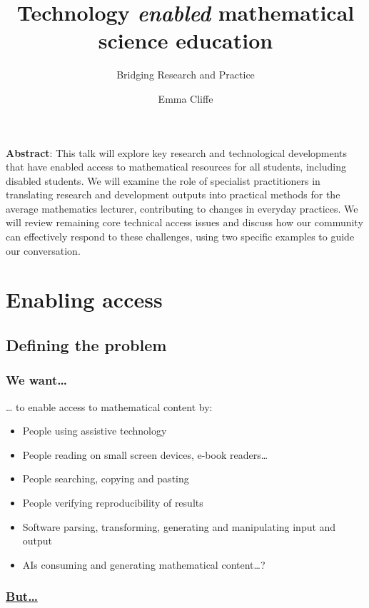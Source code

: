 \documentclass[
  letterpaper,
  DIV=11,
  numbers=noendperiod]{scrartcl}
\title{Technology \emph{enabled} mathematical science education}
\subtitle{Bridging Research and Practice}
\author{Emma Cliffe}
\date{}
\providecommand{\tightlist}{%
  \setlength{\itemsep}{0pt}\setlength{\parskip}{0pt}}\usepackage{longtable,booktabs,array}
\renewcommand*\contentsname{Table of contents}
\newcommand\contentsname{Table of contents}
\begin{document}
\maketitle

\renewcommand*\contentsname{Table of contents}
{
\hypersetup{linkcolor=}
\setcounter{tocdepth}{3}
\tableofcontents
}
\textbf{Abstract}: This talk will explore key research and technological
developments that have enabled access to mathematical resources for all
students, including disabled students. We will examine the role of
specialist practitioners in translating research and development outputs
into practical methods for the average mathematics lecturer,
contributing to changes in everyday practices. We will review remaining
core technical access issues and discuss how our community can
effectively respond to these challenges, using two specific examples to
guide our conversation.

\section{Enabling access}\label{enabling-access}

\subsection{Defining the problem}\label{defining-the-problem-1}

\subsubsection{We want\ldots{}}\label{we-want}

\ldots{} to enable access to mathematical content by:

\begin{itemize}
\tightlist
\item
  People using assistive technology
\item
  People reading on small screen devices, e-book readers\ldots{}
\item
  People searching, copying and pasting
\item
  People verifying reproducibility of results
\item
  Software parsing, transforming, generating and manipulating input and
  output
\item
  AIs consuming and generating mathematical content\ldots?
\end{itemize}

\subsubsection{\texorpdfstring{\href{./quadratic.pdf}{But\ldots{}}}{But\ldots{}}}\label{but}
\end{document}
